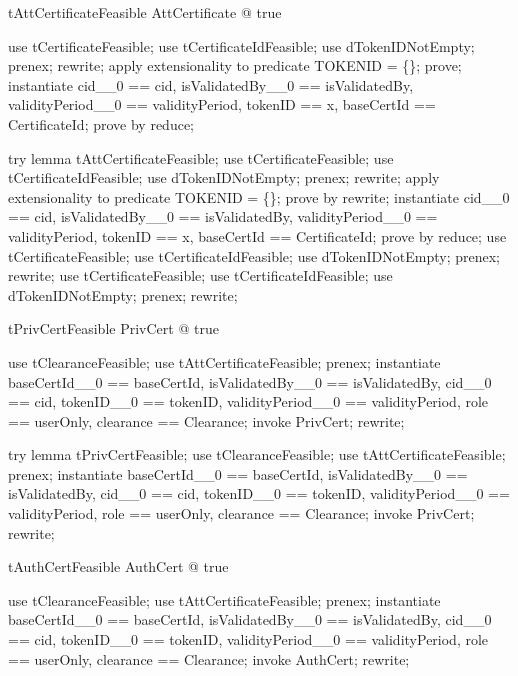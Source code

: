 \begin{theorem}{tAttCertificateFeasible}
\exists  AttCertificate @ true
\end{theorem}

\begin{zproof}[tAttCertificateFeasible]
use tCertificateFeasible;
use tCertificateIdFeasible;
use dTokenIDNotEmpty;
prenex;
rewrite;
apply extensionality to predicate TOKENID = \{\};
prove;
instantiate cid\_\_0 == cid, isValidatedBy\_\_0 == isValidatedBy, validityPeriod\_\_0 == validityPeriod, tokenID == x, baseCertId == \theta  CertificateId;
prove by reduce;
\end{zproof}

try lemma tAttCertificateFeasible;
use tCertificateFeasible;
use tCertificateIdFeasible;
use dTokenIDNotEmpty;
prenex;
rewrite;
apply extensionality to predicate TOKENID = \{\};
prove by rewrite;
instantiate
  cid\_\_0 == cid, isValidatedBy\_\_0 == isValidatedBy,
  validityPeriod\_\_0 == validityPeriod, tokenID == x,
  baseCertId == \theta CertificateId;
prove by reduce;
use tCertificateFeasible;
use tCertificateIdFeasible;
use dTokenIDNotEmpty;
prenex;
rewrite;
use tCertificateFeasible;
use tCertificateIdFeasible;
use dTokenIDNotEmpty;
prenex;
rewrite;


\begin{theorem}{tPrivCertFeasible}
\exists  PrivCert @ true
\end{theorem}

\begin{zproof}[tPrivCertFeasible]
use tClearanceFeasible;
use tAttCertificateFeasible;
prenex;
instantiate baseCertId\_\_0 == baseCertId, isValidatedBy\_\_0 == isValidatedBy, cid\_\_0 == cid, tokenID\_\_0 == tokenID, validityPeriod\_\_0 == validityPeriod, role == userOnly, clearance == \theta  Clearance;
invoke PrivCert;
rewrite;
\end{zproof}

try lemma tPrivCertFeasible;
use tClearanceFeasible;
use tAttCertificateFeasible;
prenex;
instantiate
  baseCertId\_\_0 == baseCertId, isValidatedBy\_\_0 == isValidatedBy,
  cid\_\_0 == cid, tokenID\_\_0 == tokenID,
  validityPeriod\_\_0 == validityPeriod, role == userOnly,
  clearance == \theta Clearance;
invoke PrivCert;
rewrite;


\begin{theorem}{tAuthCertFeasible}
\exists  AuthCert @ true
\end{theorem}

\begin{zproof}[tAuthCertFeasible]
use tClearanceFeasible;
use tAttCertificateFeasible;
prenex;
instantiate baseCertId\_\_0 == baseCertId, isValidatedBy\_\_0 == isValidatedBy, cid\_\_0 == cid, tokenID\_\_0 == tokenID, validityPeriod\_\_0 == validityPeriod, role == userOnly, clearance == \theta  Clearance;
invoke AuthCert;
rewrite;
\end{zproof}

